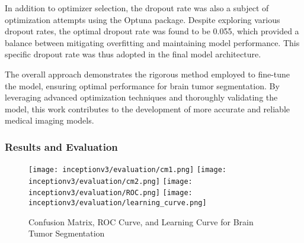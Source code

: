 In addition to optimizer selection, the dropout rate was also a subject of optimization attempts using the Optuna package. Despite exploring various dropout rates, the optimal dropout rate was found to be 0.055, which provided a balance between mitigating overfitting and maintaining model performance. This specific dropout rate was thus adopted in the final model architecture.

The overall approach demonstrates the rigorous method employed to fine-tune the model, ensuring optimal performance for brain tumor segmentation. By leveraging advanced optimization techniques and thoroughly validating the model, this work contributes to the development of more accurate and reliable medical imaging models.


\subsubsection{Results and Evaluation}

\begin{figure}[H]
  \begin{center}
    \texttt{[image: inceptionv3/evaluation/cm1.png]}
    \texttt{[image: inceptionv3/evaluation/cm2.png]}
    \texttt{[image: inceptionv3/evaluation/ROC.png]}
    \texttt{[image: inceptionv3/evaluation/learning\_curve.png]}
  \end{center}
  \caption{Confusion Matrix, ROC Curve, and Learning Curve for Brain Tumor Segmentation}\label{f:inceptionv3_evaluation}
\end{figure}

